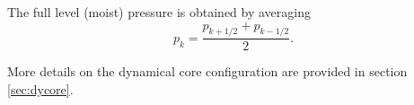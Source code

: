 \documentclass[draft]{agujournal2019}
\begin{document}
The full level (moist) pressure is obtained by averaging \cite{SB1981MWR}
\begin{equation}
p_k=\frac{p_{k+1/2}+p_{k-1/2}}{2}.\label{eq:pk}
\end{equation}







More details on the dynamical core configuration are provided in section \ref{sec:dycore}. 
%
%
%
%
\end{document}
